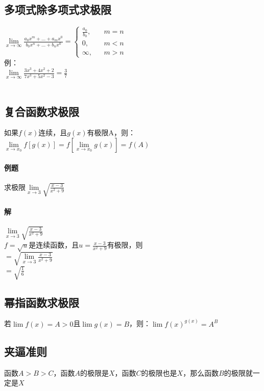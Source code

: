 \documentclass{article}
\begin{document}
\begin{flushleft}
	\subsection{多项式除多项式求极限}
	$\lim\limits_{x\to \infty} \frac{a_0x^m+...+a_mx^0}{b_0x^n+...+b_nx^0}=
	\left\{
	\begin{array}{rcl}
	\frac{a_0}{b_0},& & {m=n}\\
	0,& & {m<n}\\
	\infty,& & {m>n}
	\end{array} \right.$\\
	例：\\
	$\lim\limits_{x\to \infty} \frac{3x^3+4x^2+2}{7x^3+5x^2-3} = \frac{3}{7}$\\
	~\\
	\subsection{复合函数求极限}
	如果$f(x)$连续，且$g(x)$有极限A，则：\\
	$\lim\limits_{x\to x_0} f[g(x)]=f[\lim\limits_{x\to x_0}g(x)]=f(A)$\\
	
	\paragraph{例题}
	求极限$\lim\limits_{x\to 3}\sqrt{\frac{x-3}{x^2+9}}$
	\paragraph{解}
	$\lim\limits_{x\to 3}\sqrt{\frac{x-3}{x^2+9}}$\\
	$f=\sqrt{u}$是连续函数，且$u=\frac{x-3}{x^2+9}$有极限，则\\
	$=\sqrt{\lim\limits_{x\to 3}\frac{x-3}{x^2+9}}$\\
	$=\sqrt{\frac{1}{6}}$\\
	
	\subsection{幂指函数求极限}
	若$\lim f(x)=A>0$且$\lim g(x)=B$，则：$\lim f(x)^{g(x)}=A^B$\\
	
	\subsection{夹逼准则}
	函数$A>B>C$，函数$A$的极限是$X$，函数$C$的极限也是$X$，那么函数$B$的极限就一定是$X$\\
	

\end{flushleft}
\end{document}
